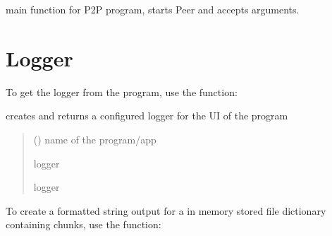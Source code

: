 \documentclass[letterpaper,10pt,english,openany,oneside]{sphinxmanual}
\begin{document}
\begin{fulllineitems}
\label{\detokenize{index:main.main}}
\pysigstartsignatures
\pysiglinewithargsret
{}
{}
{}
\pysigstopsignatures
\sphinxAtStartPar
main function for P2P program, starts Peer and accepts arguments.

\end{fulllineitems}



\chapter{Logger}
\label{\detokenize{index:logger}}
\sphinxAtStartPar
To get the logger from the program, use the  function:

\begin{fulllineitems}
\label{\detokenize{index:utils.logger.get_logger}}
\pysigstartsignatures
\pysiglinewithargsret
{}
{}
{}
\pysigstopsignatures
\sphinxAtStartPar
creates and returns a configured logger for the UI of the program
\begin{quote}\begin{description}
\sphinxAtStartPar
{} () \textendash{} name of the program/app

\sphinxAtStartPar
logger

\sphinxAtStartPar
logger

\end{description}\end{quote}

\end{fulllineitems}


\sphinxAtStartPar
To create a formatted string output for a in memory stored file dictionary containing chunks, use
the  function:
\end{document}
